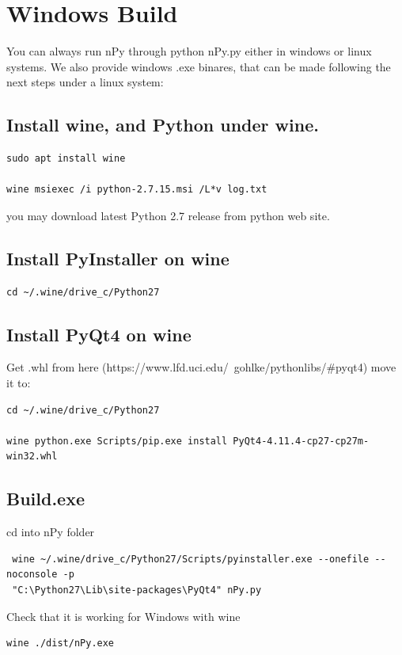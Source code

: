 \documentclass[a4paper,10pt]{article}
\begin{document}
\section{Windows Build}

You can always run nPy through python nPy.py either in windows or linux systems. We also provide windows .exe binares, that can be made following the next steps under a linux system:

\subsection{Install wine, and Python under wine.}
\begin{verbatim}
sudo apt install wine

wine msiexec /i python-2.7.15.msi /L*v log.txt
\end{verbatim}

\noindent you may download latest Python 2.7 release from python web site.

\subsection{Install PyInstaller on wine}
\begin{verbatim}
cd ~/.wine/drive_c/Python27 
\end{verbatim}

\subsection{Install PyQt4 on wine}

\noindent Get .whl from here (https://www.lfd.uci.edu/~gohlke/pythonlibs/\#pyqt4) move it to: 
\begin{verbatim}
cd ~/.wine/drive_c/Python27

wine python.exe Scripts/pip.exe install PyQt4-4.11.4-cp27-cp27m-win32.whl
\end{verbatim}

\subsection{Build.exe}
\noindent cd into nPy folder 

\begin{verbatim}
 wine ~/.wine/drive_c/Python27/Scripts/pyinstaller.exe --onefile --noconsole -p 
 "C:\Python27\Lib\site-packages\PyQt4" nPy.py
\end{verbatim}

\noindent Check that it is working for Windows with wine
\begin{verbatim}
wine ./dist/nPy.exe
\end{verbatim}
\end{document}
